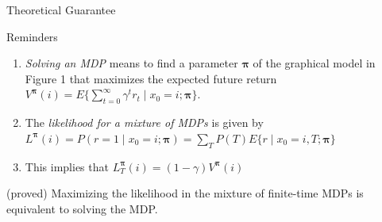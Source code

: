 \documentclass[]{beamer}
\newcommand{\policy}{\ensuremath{\boldsymbol{\pi}}}
\theoremstyle{definition}
\begin{document}
\begin{frame}{Theoretical Guarantee}
	\begin{block}{Reminders}
	    \begin{enumerate}
	        \item \emph{Solving an MDP} means to find a parameter $\policy$ of the graphical model in Figure 1 that maximizes the expected future return $V^{\policy}(i) = E\{\sum_{t=0}^\infty \gamma^t r_t \mid x_0=i ; \policy \}$.
	        \item The \emph{likelihood for a mixture of MDPs} is given by $L^{\policy}(i) = P(r = 1 \mid x_0 = i; \policy) = \sum\limits_T P(T)E\{r \mid x_0 = i, T ; \policy\}$
	        \item This implies that $L_T^{\policy}(i) = (1 - \gamma) V^{\policy}(i)$
	    \end{enumerate}
	\end{block}
    \pause
    \begin{theorem}{(proved)}
        Maximizing the likelihood in the mixture of finite-time MDPs is equivalent to solving the MDP.
    \end{theorem}
\end{frame}
\end{document}
